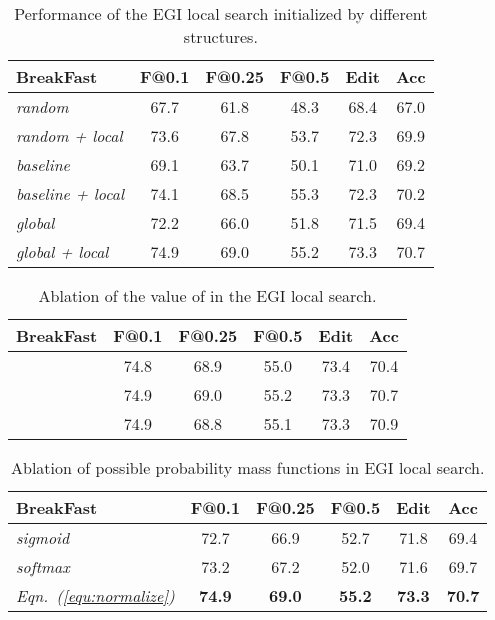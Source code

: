 \documentclass[final]{cvpr}
\renewcommand{\eqref}[1]{Eqn.~(\ref{#1})}
\newcommand{\tbf}[1]{\textbf{#1}}
\begin{document}
\begin{table}[t]
   \small
   \centering 
   \setlength{\tabcolsep}{2mm}
   \begin{tabular}{lccccc}  \toprule
   \tbf{BreakFast} 
   & F@0.1 & F@0.25 & F@0.5 & Edit  & Acc  \\
   \midrule
   \textsl{random}
   & 67.7 & 61.8 & 48.3 & 68.4 & 67.0  \\
   \textsl{random + local}
   & 73.6 & 67.8 & 53.7 & 72.3 & 69.9  \\
   \hline
   \textsl{baseline~\cite{farha2019ms}}
   & 69.1 & 63.7 & 50.1 & 71.0 & 69.2  \\
   \textsl{baseline + local}
   & 74.1 & 68.5 & 55.3 & 72.3 & 70.2  \\
   \hline
   \textsl{global}
   & 72.2 & 66.0 & 51.8 & 71.5 & 69.4 \\
   \textsl{global + local}
   & 74.9 & 69.0 & 55.2 & 73.3 & 70.7 \\
   \bottomrule 
   \end{tabular}
   \vspace{2pt}
   \caption{Performance of the EGI local search initialized by different structures.} 
   \label{tab:ablation_local_init}
\end{table}

\begin{table}[t]
   \small
   \centering 
   \setlength{\tabcolsep}{2.5mm}
   \begin{tabular}{lccccc}  \toprule
   \tbf{BreakFast} 
   & F@0.1 & F@0.25 & F@0.5 & Edit  & Acc  \\
   \midrule
   \textsl{}
   & 74.8 & 68.9 & 55.0 & 73.4 & 70.4  \\
   \textsl{}
   & 74.9 & 69.0 & 55.2 & 73.3 & 70.7  \\
   \textsl{}
   & 74.9 & 68.8 & 55.1 & 73.3 & 70.9  \\
   \bottomrule 
   \end{tabular}
   \vspace{2pt}
   \caption{Ablation of the value of  in the EGI local search.} 
   \label{tab:ablation_s}
\end{table}

\begin{table}[t]
   \small
   \centering 
   \setlength{\tabcolsep}{2.5mm}
   \begin{tabular}{lccccc}  \toprule
   \tbf{BreakFast} 
   & F@0.1 & F@0.25 & F@0.5 & Edit  & Acc \\
   \midrule
   \textsl{sigmoid}
   & 72.7 & 66.9 & 52.7 & 71.8 & 69.4  \\
   \textsl{softmax}
   & 73.2 & 67.2 & 52.0 & 71.6 & 69.7 \\
   \textsl{\eqref{equ:normalize}}
   & \tbf{74.9} & \tbf{69.0} & \tbf{55.2} & \tbf{73.3} & \tbf{70.7} \\
   \bottomrule 
   \end{tabular}
   \vspace{2pt}
   \caption{Ablation of possible probability mass functions in EGI local search.} 
   \vspace{-8pt}
   \label{tab:ablation_weight_function}
\end{table}
\end{document}
